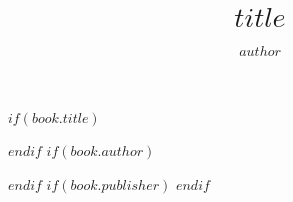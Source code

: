 

$if(book.title)$
\title{$title$} 
$endif$
$if(book.author)$
\author{$author$} 
$endif$
$if(book.publisher)$
$endif$





